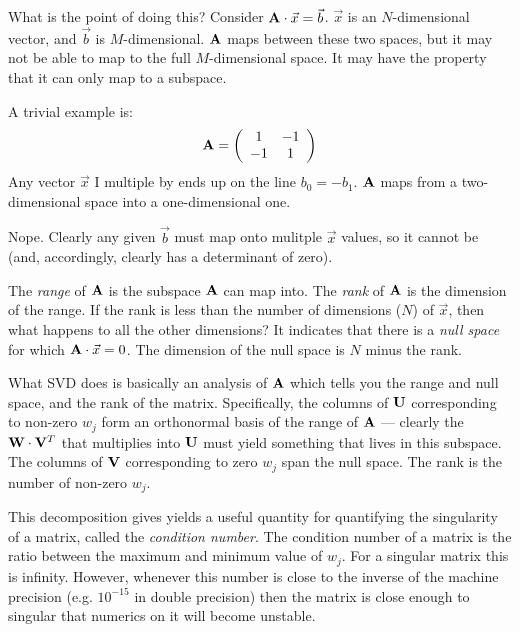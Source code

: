 What is the point of doing this? Consider ${\bf A}\cdot\vec{x} =
\vec{b}$. $\vec{x}$ is an $N$-dimensional vector, and $\vec{b}$ is
$M$-dimensional. ${\bf A}$ maps between these two spaces, but it may
not be able to map to the full $M$-dimensional space.  It may have the
property that it can only map to a subspace.

A trivial example is:
\begin{equation}
  {\bf A} = \left(\begin{array}{cc}
    1 & -1\cr
    -1 & 1
    \end{array}\right)
\end{equation}
Any vector $\vec{x}$ I multiple by ends up on the line $b_0 =
-b_1$. ${\bf A}$ maps from a two-dimensional space into a
one-dimensional one.


\begin{answer}
  Nope. Clearly any given $\vec{b}$ must map onto mulitple $\vec{x}$
  values, so it cannot be (and, accordingly, clearly has a determinant
  of zero).
\end{answer}

The {\it range} of ${\bf A}$ is the subspace ${\bf A}$ can map
into. The {\it rank} of ${\bf A}$ is the dimension of the range.  If
the rank is less than the number of dimensions ($N$) of $\vec{x}$,
then what happens to all the other dimensions? It indicates that there
is a {\it null space} for which $ {\bf A}\cdot \vec{x} = 0$. The
dimension of the null space is $N$ minus the rank.

What SVD does is basically an analysis of ${\bf A}$ which tells you
the range and null space, and the rank of the matrix. Specifically,
the columns of ${\bf U}$ corresponding to non-zero $w_j$ form an
orthonormal basis of the range of ${\bf A}$ --- clearly the ${\bf
W}\cdot{\bf V}^T$ that multiplies into ${\bf U}$ must yield something
that lives in this subspace. The columns of ${\bf V}$ corresponding to
zero $w_j$ span the null space.  The rank is the number of non-zero
$w_j$.

This decomposition gives yields a useful quantity for quantifying the
singularity of a matrix, called the {\it condition number}. The
condition number of a matrix is the ratio between the maximum and
minimum value of $w_j$. For a singular matrix this is
infinity. However, whenever this number is close to the inverse of the
machine precision (e.g. $10^{-15}$ in double precision) then the
matrix is close enough to singular that numerics on it will become
unstable. 

